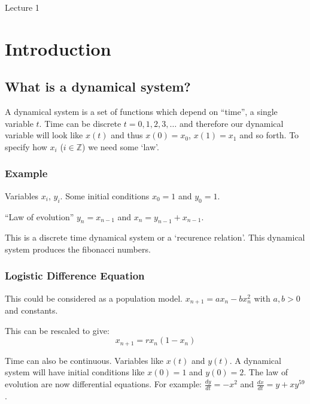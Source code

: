 \begin{center}

Lecture 1

\end{center}

\section*{Introduction}

\subsection*{What is a dynamical system?}

A dynamical system is a set of functions which depend on ``time'', a single variable $t$. Time can be discrete $t=0,1,2,3,\ldots$ and therefore our dynamical variable will look like $x(t)$ and thus $x(0)=x_0$, $x(1)=x_1$ and so forth. To specify how $x_i$ ($i \in \mathbb{Z}$) we need some `law'.

\subsubsection*{Example}

Variables $x_i$, $y_i$. Some initial conditions $x_0 = 1$ and $y_0 = 1$.

\vspace{\baselineskip}

``Law of evolution'' $y_n = x_{n-1}$ and $x_n = y_{n-1} + x_{n-1}$.

This is a discrete time dynamical system or a `recurence relation'. This dynamical system produces the fibonacci numbers.

\subsubsection*{Logistic Difference Equation}

This could be considered as a population model.  $ x_{n+1} = a x_n - b x_n^2$ with $a,b > 0$ and constants.

This can be rescaled to give: $$x_{n+1} = r x_n (1-x_n)$$

\vspace{\baselineskip}

Time can also be continuous. Variables like $x(t)$ and $y(t)$. A dynamical system will have initial conditions like $x(0) = 1$ and $y(0) = 2$. The law of evolution are now differential equations. For example: $\frac{dy}{dt} = - x^2$ and $\frac{dx}{dt} = y + xy^59$. 